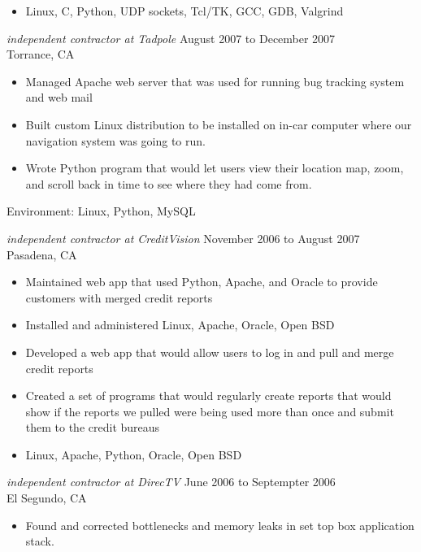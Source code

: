 \documentclass{res}
\begin{document}
\begin{resume}
\begin{itemize}
\item Linux, C, Python, UDP sockets, Tcl/TK, GCC, GDB, Valgrind
\end{itemize}

{\sl independent contractor at Tadpole} \hfill August 2007 to December 2007\\
Torrance, CA
\begin{itemize}

\item Managed Apache web server that was used for running bug
tracking system and web mail

\item Built custom Linux distribution to be installed on in-car
computer where our navigation system was going to run.

\item Wrote Python program that would let users view their location
map, zoom, and scroll back in time to see where they had come from.

\end{itemize}

Environment:  Linux, Python, MySQL

{\sl independent contractor at CreditVision} \hfill November 2006 to August 2007\\
Pasadena, CA
\begin{itemize}
\item Maintained web app that used Python, Apache, and Oracle to
provide customers with merged credit reports
\item Installed and administered Linux, Apache, Oracle, Open BSD
\item Developed a web app that would allow users to log in and
pull and merge credit reports
\item Created a set of programs that would regularly create reports
that would show if the reports we pulled were being used more than
once and submit them to the credit bureaus
\item  Linux, Apache, Python, Oracle, Open BSD
\end{itemize}

{\sl independent contractor at DirecTV} \hfill June 2006 to Septempter 2006\\
El Segundo, CA

\begin{itemize}

\item Found and corrected bottlenecks and memory leaks in set top
box application stack.


\end{itemize}
\end{resume}
\end{document}
